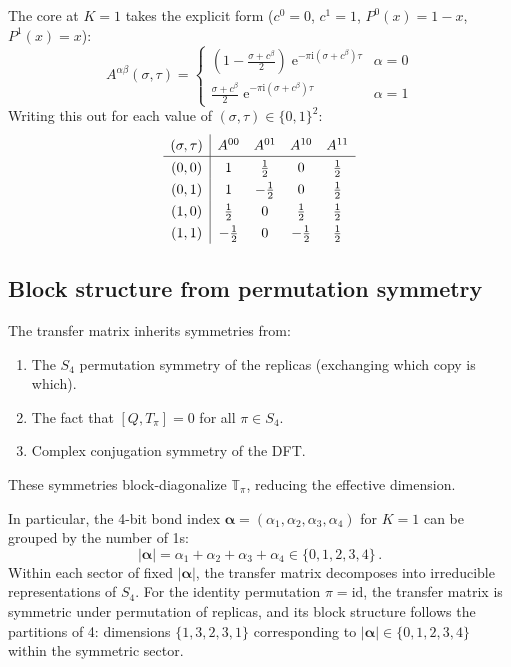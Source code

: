 \documentclass[11pt,a4paper]{article}
\theoremstyle{definition}
\theoremstyle{remark}
\newcommand{\ee}{\mathrm{e}}
\newcommand{\ii}{\mathrm{i}}
\begin{document}
The core at $K=1$ takes the explicit form ($c^0=0$, $c^1=1$, $P^0(x)=1-x$, $P^1(x)=x$):
\begin{equation}
  A^{\alpha\beta}(\sigma,\tau) = \begin{cases}
    (1-\frac{\sigma+c^\beta}{2})\;\ee^{-\pi\ii(\sigma+c^\beta)\tau} & \alpha=0\\[4pt]
    \frac{\sigma+c^\beta}{2}\;\ee^{-\pi\ii(\sigma+c^\beta)\tau} & \alpha=1
  \end{cases}
\end{equation}
Writing this out for each value of $(\sigma,\tau)\in\{0,1\}^2$:
\begin{equation}\label{eq:K1_values}
\renewcommand{\arraystretch}{1.3}
\begin{array}{c|cccc}
  (\sigma,\tau) & A^{00} & A^{01} & A^{10} & A^{11} \\
  \hline
  (0,0) & 1 & \tfrac{1}{2} & 0 & \tfrac{1}{2} \\
  (0,1) & 1 & -\tfrac{1}{2} & 0 & \tfrac{1}{2} \\
  (1,0) & \tfrac{1}{2} & 0 & \tfrac{1}{2} & \tfrac{1}{2} \\
  (1,1) & -\tfrac{1}{2} & 0 & -\tfrac{1}{2} & \tfrac{1}{2}
\end{array}
\end{equation}

\subsection{Block structure from permutation symmetry}

The transfer matrix inherits symmetries from:
\begin{enumerate}[label=(\alph*)]
  \item The $S_4$ permutation symmetry of the replicas (exchanging which copy is which).
  \item The fact that $[Q,T_\pi]=0$ for all $\pi\in S_4$.
  \item Complex conjugation symmetry of the DFT.
\end{enumerate}
These symmetries block-diagonalize $\mathbb{T}_\pi$, reducing the effective dimension.

In particular, the 4-bit bond index $\boldsymbol{\alpha}=(\alpha_1,\alpha_2,\alpha_3,\alpha_4)$ for $K=1$ can be grouped by the number of 1s:
\begin{equation}
  |\boldsymbol{\alpha}| = \alpha_1+\alpha_2+\alpha_3+\alpha_4 \in \{0,1,2,3,4\}\,.
\end{equation}
Within each sector of fixed $|\boldsymbol{\alpha}|$, the transfer matrix decomposes into irreducible representations of $S_4$.  For the identity permutation $\pi=\mathrm{id}$, the transfer matrix is symmetric under permutation of replicas, and its block structure follows the partitions of 4: dimensions $\{1, 3, 2, 3, 1\}$ corresponding to $|\boldsymbol{\alpha}|\in\{0,1,2,3,4\}$ within the symmetric sector.
\end{document}
